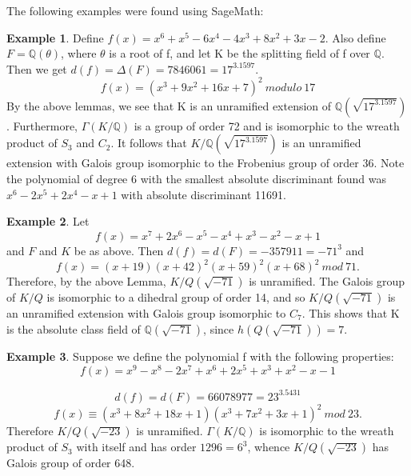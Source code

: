 \documentclass[12pt]{extarticle}
\newcommand{\<}{\langle}
\renewcommand{\>}{\rangle}
\theoremstyle{definition}
\newtheorem*{example}{Example}
\begin{document}
The following examples were found using SageMath:
\begin{example}
Define $f(x)=x^6 + x^5 - 6x^4 - 4x^3 + 8x^2 + 3x - 2$. Also define $F=\mathbb{Q}(\theta)$, where $\theta$ is a root of f, and let K be the splitting field of f over $\mathbb{Q}$. Then we get $d(f)=\Delta(F)=7846061=17^3.1597$. 
\begin{equation}
   f(x)= (x^3 + 9x^2 + 16x + 7)^2\:modulo\:17
\end{equation}
By the above lemmas, we see that K is an unramified extension of $\mathbb{Q}(\sqrt{17^3.1597})$. Furthermore, $\Gamma(K/\mathbb{Q})$ is a group of order 72 and is isomorphic to the wreath product of $S_3$ and $C_2$. It follows that $K/\mathbb{Q}(\sqrt{17^3.1597})$ is an unramified extension with Galois group isomorphic to the Frobenius group of order 36.
Note the polynomial of degree 6 with the smallest absolute discriminant found was $x^6 - 2x^5 + 2x^4 - x + 1$ with absolute discriminant 11691.
\end{example}
\begin{example}
 Let \begin{equation}
     f(x)=x^7 + 2x^6 - x^5 - x^4 + x^3 - x^2 - x + 1
 \end{equation}and $F$ and $K$ be as above.
Then $d(f)=d(F)=-357911=-71^{3}$ and
\begin{equation}
    f(x)=(x + 19)(x + 42)^2 (x + 59)^2(x + 68)^2\:mod\:71.
\end{equation}
Therefore, by the above Lemma, $K/Q(\sqrt{-71})$ is unramified. The Galois group of $K/Q$
is isomorphic to a dihedral group of order 14, and so $K/Q(\sqrt{-71})$
is an unramified extension with Galois group isomorphic to $C_7$.
This shows that K is the absolute class field of $\mathbb{Q}(\sqrt{-71})$, since $h(Q(\sqrt{-71}))=7$.
\end{example}
\begin{example}
    Suppose we define the polynomial f with the following properties: \begin{equation}
        f(x) =x^9 - x^8 - 2x^7 + x^6 + 2x^5 + x^3 + x^2 - x - 1
    \end{equation} \par
    \begin{equation}
        d(f)=d(F)=66078977=23^3.5431
    \end{equation} 
    \begin{equation}
        f(x)\equiv(x^3 + 8x^2 + 18x + 1)(x^3 + 7x^2 + 3x + 1)^2\:mod\:23.
    \end{equation}
Therefore  $K/Q(\sqrt{-23})$ is unramified. $\Gamma(K/\mathbb{Q})$ is isomorphic to the wreath product of $S_3$ with itself and has order $1296=6^3$, whence $K/Q(\sqrt{-23})$ has Galois group of order 648.
\end{example}
\end{document}
